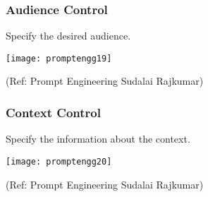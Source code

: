 \begin{frame}[fragile]\frametitle{Audience Control}

Specify the desired audience.

\begin{center}
\texttt{[image: promptengg19]}

{\tiny (Ref: Prompt Engineering Sudalai Rajkumar)}

\end{center}		

\end{frame}

\begin{frame}[fragile]\frametitle{Context Control}

Specify the information about the context.

\begin{center}
\texttt{[image: promptengg20]}

{\tiny (Ref: Prompt Engineering Sudalai Rajkumar)}

\end{center}		

\end{frame}








		






